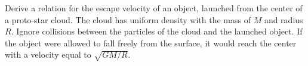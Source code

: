 Derive a relation for the escape velocity of an object, launched from the
center of a proto-star cloud. The cloud has uniform density with the mass of
$M$ and radius $R$. Ignore collisions between the particles of the cloud and
the launched object. If the object were allowed to fall freely from the
surface, it would reach the center with a velocity equal to $\sqrt{GM/R}$.
